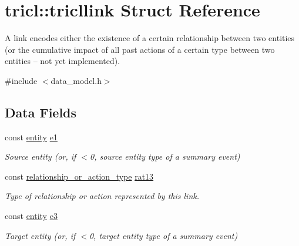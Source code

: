 \hypertarget{structtricl_1_1tricllink}{}\section{tricl\+:\+:tricllink Struct Reference}
\label{structtricl_1_1tricllink}


A link encodes either the existence of a certain relationship between two entities (or the cumulative impact of all past actions of a certain type between two entities -- not yet implemented).  




{\ttfamily \#include $<$data\+\_\+model.\+h$>$}

\subsection*{Data Fields}
\begin{DoxyCompactItemize}
\item 
\mbox{\label{structtricl_1_1tricllink_a8ce5b8b685b37cd2a75d6313d788583c}} 
const \hyperlink{namespacetricl_a57273122278e8b301844e2a2e1f0742f}{entity} \hyperlink{structtricl_1_1tricllink_a8ce5b8b685b37cd2a75d6313d788583c}{e1}
\begin{DoxyCompactList}\small\item\em Source entity (or, if $<$0, source entity type of a summary event) \end{DoxyCompactList}\item 
\mbox{\label{structtricl_1_1tricllink_aef5d5562ea247aa295e3daa1fd411d2b}} 
const \hyperlink{namespacetricl_a2d01894944fb58a8fedc0912a48d13f8}{relationship\+\_\+or\+\_\+action\+\_\+type} \hyperlink{structtricl_1_1tricllink_aef5d5562ea247aa295e3daa1fd411d2b}{rat13}
\begin{DoxyCompactList}\small\item\em Type of relationship or action represented by this link. \end{DoxyCompactList}\item 
\mbox{\label{structtricl_1_1tricllink_ac09507996bf799514eeb01a7273e9212}} 
const \hyperlink{namespacetricl_a57273122278e8b301844e2a2e1f0742f}{entity} \hyperlink{structtricl_1_1tricllink_ac09507996bf799514eeb01a7273e9212}{e3}
\begin{DoxyCompactList}\small\item\em Target entity (or, if $<$0, target entity type of a summary event) \end{DoxyCompactList}\end{DoxyCompactItemize}
